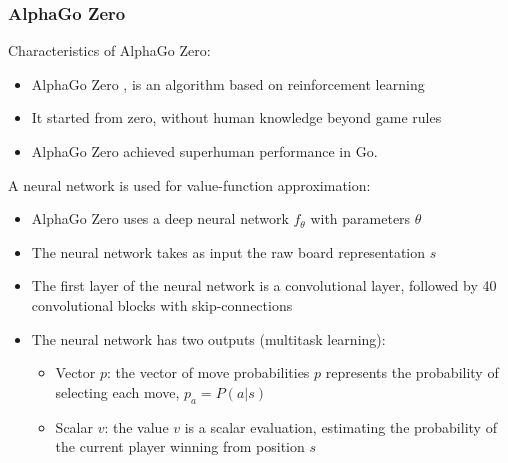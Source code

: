 \documentclass[9pt]{beamer}
\begin{document}

\begin{frame}
	\frametitle{AlphaGo Zero}
	Characteristics of AlphaGo Zero:
	\begin{itemize}
		\item AlphaGo Zero \cite{silver2017mastering}, is an algorithm based on reinforcement learning
		\item It started from zero, without human knowledge beyond game rules
		\item AlphaGo Zero achieved superhuman performance in Go.
	\end{itemize}

	A neural network is used for value-function approximation:
	\begin{itemize}
		\item AlphaGo Zero uses a deep neural network $f_\theta$ with parameters $\theta$
		\item The neural network takes as input the raw board representation $s$
		\item The first layer of the neural network is a convolutional layer, followed by 40 convolutional blocks with skip-connections
		\item The neural network has two outputs (multitask learning):
		\begin{itemize}		
			\item Vector $p$: the vector of move probabilities $p$ represents the probability of selecting each move, $p_a = P(a | s)$
			\item Scalar $v$: the value $v$ is a scalar evaluation, estimating the probability of the current player winning from position $s$
		\end{itemize}
	\end{itemize}
\end{frame}


\end{document}

